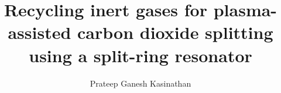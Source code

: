 \documentclass[a4paper,12pt,twoside]{report}
\begin{document}
\title{\LARGE {\bf Recycling inert gases for plasma-assisted carbon dioxide splitting using a split-ring resonator}\\
 \vspace*{6mm}
}

\author{Prateep Ganesh Kasinathan}

\normallinespacing
\maketitle

\preface
%

\body









%

\appendix






\end{document}
